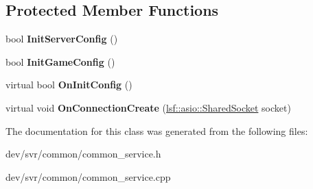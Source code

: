 \subsection*{Protected Member Functions}
\begin{DoxyCompactItemize}
\item 
\hypertarget{classConnectConfigService_a3378e8e958bc7440f33abf310918f49e}{
bool {\bfseries InitServerConfig} ()}
\label{classConnectConfigService_a3378e8e958bc7440f33abf310918f49e}

\item 
\hypertarget{classConnectConfigService_ac6355369992b0d328d4ec0ad721f75f3}{
bool {\bfseries InitGameConfig} ()}
\label{classConnectConfigService_ac6355369992b0d328d4ec0ad721f75f3}

\item 
\hypertarget{classConnectConfigService_a2d58a2cb6e2704a22211bf451dcdf58a}{
virtual bool {\bfseries OnInitConfig} ()}
\label{classConnectConfigService_a2d58a2cb6e2704a22211bf451dcdf58a}

\item 
\hypertarget{classConnectConfigService_a9c8c9c937e7a6577385a711ee2bd60ce}{
virtual void {\bfseries OnConnectionCreate} (\hyperlink{classlsf_1_1asio_1_1SharedSocket}{lsf::asio::SharedSocket} socket)}
\label{classConnectConfigService_a9c8c9c937e7a6577385a711ee2bd60ce}

\end{DoxyCompactItemize}


The documentation for this class was generated from the following files:\begin{DoxyCompactItemize}
\item 
dev/svr/common/common\_\-service.h\item 
dev/svr/common/common\_\-service.cpp\end{DoxyCompactItemize}
